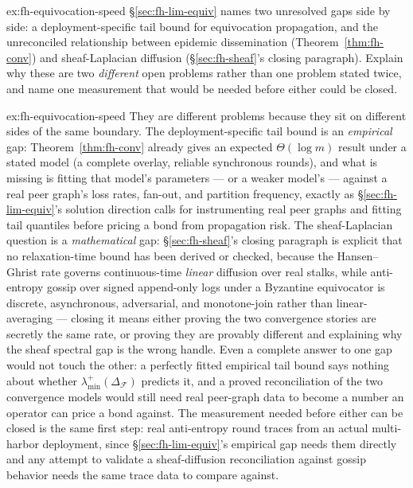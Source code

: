 \documentclass[11pt,a4paper]{article}
\theoremstyle{definition}
\theoremstyle{remark}
\begin{document}
\begin{pdexercise}[kind=Open,rating=3]{ex:fh-equivocation-speed}
\S\ref{sec:fh-lim-equiv} names two unresolved gaps side by side: a deployment-specific tail bound for equivocation propagation, and the unreconciled relationship between epidemic dissemination (Theorem~\ref{thm:fh-conv}) and sheaf-Laplacian diffusion (\S\ref{sec:fh-sheaf}'s closing paragraph). Explain why these are two \emph{different} open problems rather than one problem stated twice, and name one measurement that would be needed before either could be closed.
\end{pdexercise}
\begin{pdsolution}{ex:fh-equivocation-speed}
They are different problems because they sit on different sides of the same boundary. The deployment-specific tail bound is an \emph{empirical} gap: Theorem~\ref{thm:fh-conv} already gives an expected $\Theta(\log m)$ result under a stated model (a complete overlay, reliable synchronous rounds), and what is missing is fitting that model's parameters --- or a weaker model's --- against a real peer graph's loss rates, fan-out, and partition frequency, exactly as \S\ref{sec:fh-lim-equiv}'s solution direction calls for instrumenting real peer graphs and fitting tail quantiles before pricing a bond from propagation risk. The sheaf-Laplacian question is a \emph{mathematical} gap: \S\ref{sec:fh-sheaf}'s closing paragraph is explicit that no relaxation-time bound has been derived or checked, because the Hansen--Ghrist rate governs continuous-time \emph{linear} diffusion over real stalks, while anti-entropy gossip over signed append-only logs under a Byzantine equivocator is discrete, asynchronous, adversarial, and monotone-join rather than linear-averaging --- closing it means either proving the two convergence stories are secretly the same rate, or proving they are provably different and explaining why the sheaf spectral gap is the wrong handle. Even a complete answer to one gap would not touch the other: a perfectly fitted empirical tail bound says nothing about whether $\lambda_{\min}^{+}(\Delta_{\mathcal F})$ predicts it, and a proved reconciliation of the two convergence models would still need real peer-graph data to become a number an operator can price a bond against. The measurement needed before either can be closed is the same first step: real anti-entropy round traces from an actual multi-harbor deployment, since \S\ref{sec:fh-lim-equiv}'s empirical gap needs them directly and any attempt to validate a sheaf-diffusion reconciliation against gossip behavior needs the same trace data to compare against.
\end{pdsolution}
\end{document}
